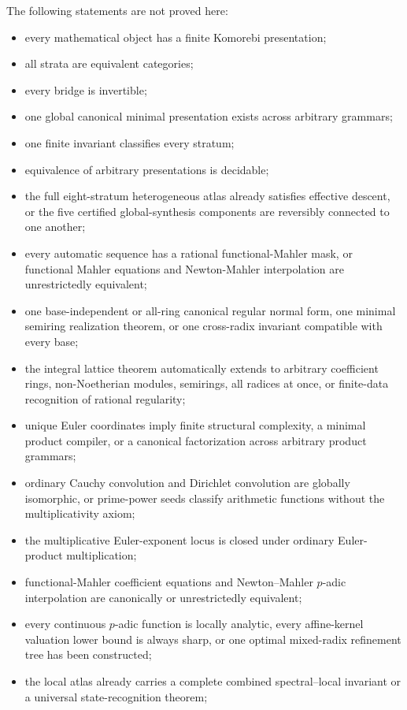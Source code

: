 The following statements are not proved here:

\begin{itemize}
\item every mathematical object has a finite Komorebi presentation;
\item all strata are equivalent categories;
\item every bridge is invertible;
\item one global canonical minimal presentation exists across arbitrary grammars;
\item one finite invariant classifies every stratum;
\item equivalence of arbitrary presentations is decidable;
\item the full eight-stratum heterogeneous atlas already satisfies effective descent, or the five certified global-synthesis components are reversibly connected to one another;
\item every automatic sequence has a rational functional-Mahler mask, or functional Mahler equations and Newton-Mahler interpolation are unrestrictedly equivalent;
\item one base-independent or all-ring canonical regular normal form, one minimal semiring realization theorem, or one cross-radix invariant compatible with every base;
\item the integral lattice theorem automatically extends to arbitrary coefficient rings, non-Noetherian modules, semirings, all radices at once, or finite-data recognition of rational regularity;
\item unique Euler coordinates imply finite structural complexity, a minimal product compiler, or a canonical factorization across arbitrary product grammars;
\item ordinary Cauchy convolution and Dirichlet convolution are globally isomorphic, or prime-power seeds classify arithmetic functions without the multiplicativity axiom;
\item the multiplicative Euler-exponent locus is closed under ordinary Euler-product multiplication;
\item functional-Mahler coefficient equations and Newton--Mahler \(p\)-adic interpolation are canonically or unrestrictedly equivalent;
\item every continuous \(p\)-adic function is locally analytic, every affine-kernel valuation lower bound is always sharp, or one optimal mixed-radix refinement tree has been constructed;
\item the local atlas already carries a complete combined spectral--local invariant or a universal state-recognition theorem;

\end{itemize}
